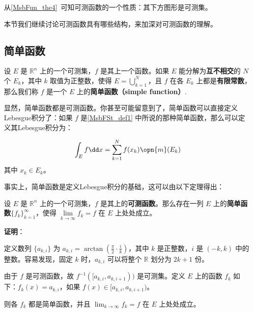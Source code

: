 

从\autoref{MsbFun_the4}~可知可测函数的一个性质：其下方图形是可测集。

本节我们继续讨论可测函数具有哪些结构，来加深对可测函数的理解。

\subsection{简单函数}

\begin{definition}{}\label{MsbFSt_def1}
设 $E$ 是 $\mathbb{R}^n$ 上的一个可测集，$f$ 是其上一个函数。如果 $E$ 能分解为\textbf{互不相交}的 $N$ 个 $E_k$，其中 $k$ 取值为正整数，使得 $E=\bigcup_{k=1}^N$，且 $f$ 在各 $E_k$ 上都是\textbf{有限常数}，那么我们称 $f$ 是一个 $E$ 上的\textbf{简单函数（simple function）}.
\end{definition}

显然，简单函数都是可测函数。你甚至可能留意到了，简单函数可以直接定义Lebesgue积分了：如果 $f$ 是\autoref{MsbFSt_def1} 中所说的那种简单函数，那么可以定义其Lebesgue积分为：

\begin{equation}\label{MsbFSt_eq1}
\int_E f \dd x = \sum_{k=1}^N f(x_k) \opn{m}(E_k)
\end{equation}
其中 $x_k\in E_k$。

事实上，简单函数是定义Lebesgue积分的基础，这可以由以下定理得出：

\begin{theorem}{}\label{MsbFSt_the1}
设 $E$ 是 $\mathbb{R}^n$ 上的一个可测集，$f$ 是其上的\textbf{可测函数}。那么存在一列 $E$ 上的\textbf{简单函数}$\{f_k\}_{k=1}^\infty$，使得 $\lim\limits_{k\to\infty}f_k=f$ 在 $E$ 上处处成立。
\end{theorem}

\textbf{证明}：

定义数列 $\{a_{k, i}\}$ 为 $a_{k, i}=\arctan(\frac{\pi}{2}\cdot\frac{i}{k})$，其中 $k$ 是正整数，$i$ 是 $(-k, k)$ 中的整数。容易发现，固定 $k$ 时，$a_{k, i}$ 可以将整个 $\mathbb{R}$ 划分为 $2k+1$ 份。

由于 $f$ 是可测函数，故 $f^{-1}([a_{k, i}, a_{k, i+1}))$ 是可测集。定义 $E$ 上的函数 $f_k$ 如下：$f_k(x)=a_{k, i}$，如果 $f(x)\in [a_{k, i}, a_{k, i+1})$。

则各 $f_k$ 都是简单函数，并且 $\lim_{k\to\infty}f_k=f$ 在 $E$ 上处处成立。

